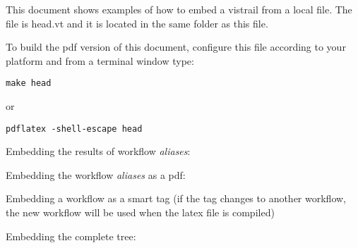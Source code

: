 \documentclass{article}
\begin{document}
This document shows examples of how to embed a vistrail from a local
file. The file is head.vt and it is located in the same folder as this
file.

To build the pdf version of this document, configure this file
according to your platform and from a terminal window type:
\begin{verbatim}
make head
\end{verbatim}

or
\begin{verbatim}
pdflatex -shell-escape head
\end{verbatim}

Embedding the results of workflow \emph{aliases}:
\begin{center}
\end{center}

Embedding the workflow \emph{aliases} as a pdf:
\begin{center}
\end{center}

Embedding a workflow as a smart tag (if the tag changes to another
workflow, the new workflow will be used when the latex file is
compiled)
\begin{center}
\end{center}

Embedding the complete tree:
\begin{center}
\end{center}




\end{document}
